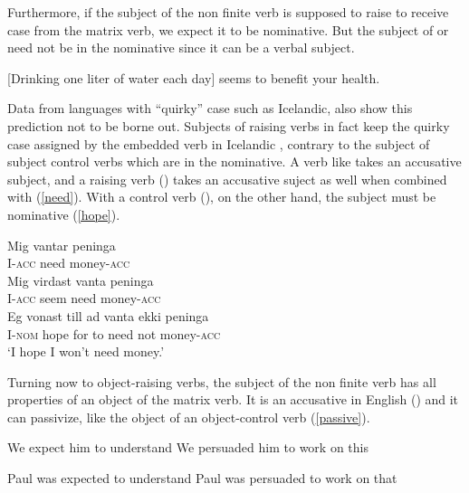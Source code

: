 \documentclass[output=paper]{langsci/langscibook}
\begin{document}
 Furthermore, if the subject of the non finite verb is supposed to raise to receive case from the matrix verb, we expect it to be nominative. 
 But the subject of  or  need not be in the nominative since it can be a verbal subject.
 
	
\ea 
{}[Drinking one liter of water each day] seems to benefit your health.
\z

Data from languages with ``quirky'' case such as Icelandic, also show this prediction not to be borne out.  Subjects of raising verbs in fact keep the quirky case assigned by the embedded verb in Icelandic \citep{Zaenenetal1985}, contrary to the subject of subject control verbs which are in the nominative. A verb like  takes an accusative subject, and a raising verb () takes an accusative suject as well when combined with  (\ref{need}). With a control verb (), on the other hand, the subject must be nominative (\ref{hope}).

\begin{exe}
\ex \begin{xlist}
\ex \gll Mig vantar peninga \\
I-\textsc{acc} need money-\textsc{acc} \\
\ex \gll Mig virdast vanta peninga \label{need} \\
I-\textsc{acc} seem need money-\textsc{acc} \\
\ex \gll Eg vonast till ad vanta ekki peninga \label{hope} \\
I-\textsc{nom} hope for to need not money-\textsc{acc} \\
\glt `I hope I won't need money.'
	\end{xlist}	
	
\end{exe}

Turning now to object-raising verbs, the subject of the non finite verb has all properties of an object of the matrix verb. It is an accusative in English () and it can passivize, like the object of an object-control verb (\ref{passive}).

\begin{exe}
\ex
\begin{xlist}
\ex We expect him to understand
\ex  We persuaded him to work on this
\end{xlist}
\ex \begin{xlist} \label{passive}
\ex  Paul was expected to understand
\ex 	Paul was persuaded to work on that
\end{xlist}
	
\end{exe}
\end{document}
